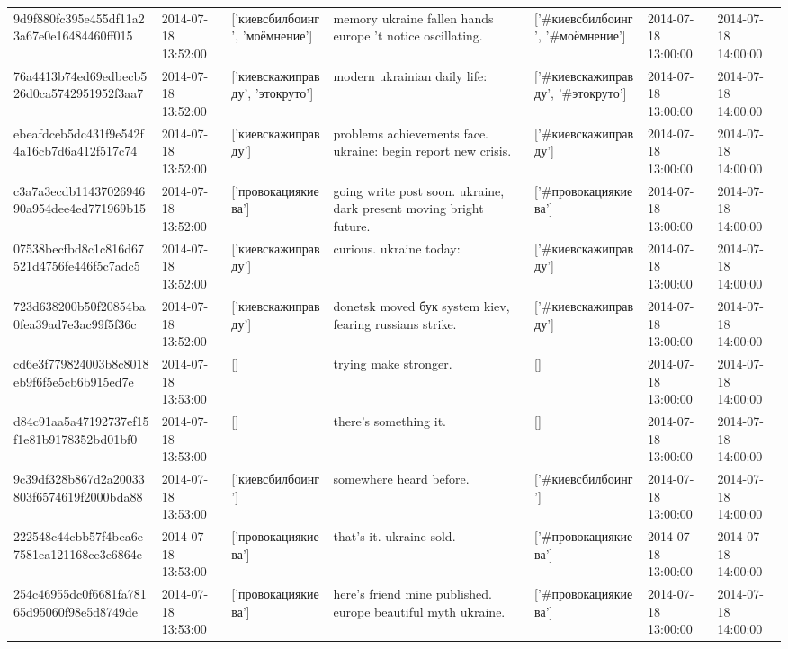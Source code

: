 \begin{tabular}{lllllll}
9d9f880fc395e455df11a23a67e0e16484460ff015 & 2014-07-18 13:52:00 & ['киевсбилбоинг', 'моёмнение'] & memory ukraine fallen hands europe 't notice oscillating. & ['#киевсбилбоинг', '#моёмнение'] & 2014-07-18 13:00:00 & 2014-07-18 14:00:00 \\
76a4413b74ed69edbecb526d0ca5742951952f3aa7 & 2014-07-18 13:52:00 & ['киевскажиправду', 'этокруто'] & modern ukrainian daily life: & ['#киевскажиправду', '#этокруто'] & 2014-07-18 13:00:00 & 2014-07-18 14:00:00 \\
ebeafdceb5dc431f9e542f4a16cb7d6a412f517c74 & 2014-07-18 13:52:00 & ['киевскажиправду'] & problems achievements face. ukraine: begin report new crisis. & ['#киевскажиправду'] & 2014-07-18 13:00:00 & 2014-07-18 14:00:00 \\
c3a7a3ecdb1143702694690a954dee4ed771969b15 & 2014-07-18 13:52:00 & ['провокациякиева'] & going write post soon. ukraine, dark present moving bright future. & ['#провокациякиева'] & 2014-07-18 13:00:00 & 2014-07-18 14:00:00 \\
07538becfbd8c1c816d67521d4756fe446f5c7adc5 & 2014-07-18 13:52:00 & ['киевскажиправду'] & curious. ukraine today: & ['#киевскажиправду'] & 2014-07-18 13:00:00 & 2014-07-18 14:00:00 \\
723d638200b50f20854ba0fea39ad7e3ac99f5f36c & 2014-07-18 13:52:00 & ['киевскажиправду'] & donetsk moved бук system kiev, fearing russians strike. & ['#киевскажиправду'] & 2014-07-18 13:00:00 & 2014-07-18 14:00:00 \\
cd6e3f779824003b8c8018eb9f6f5e5cb6b915ed7e & 2014-07-18 13:53:00 & [] & trying make stronger. & [] & 2014-07-18 13:00:00 & 2014-07-18 14:00:00 \\
d84c91aa5a47192737ef15f1e81b9178352bd01bf0 & 2014-07-18 13:53:00 & [] & there's something it. & [] & 2014-07-18 13:00:00 & 2014-07-18 14:00:00 \\
9c39df328b867d2a20033803f6574619f2000bda88 & 2014-07-18 13:53:00 & ['киевсбилбоинг'] & somewhere heard before. & ['#киевсбилбоинг'] & 2014-07-18 13:00:00 & 2014-07-18 14:00:00 \\
222548c44cbb57f4bea6e7581ea121168ce3e6864e & 2014-07-18 13:53:00 & ['провокациякиева'] & that's it. ukraine sold. & ['#провокациякиева'] & 2014-07-18 13:00:00 & 2014-07-18 14:00:00 \\
254c46955dc0f6681fa78165d95060f98e5d8749de & 2014-07-18 13:53:00 & ['провокациякиева'] & here's friend mine published. europe beautiful myth ukraine. & ['#провокациякиева'] & 2014-07-18 13:00:00 & 2014-07-18 14:00:00 \\

\end{tabular}
